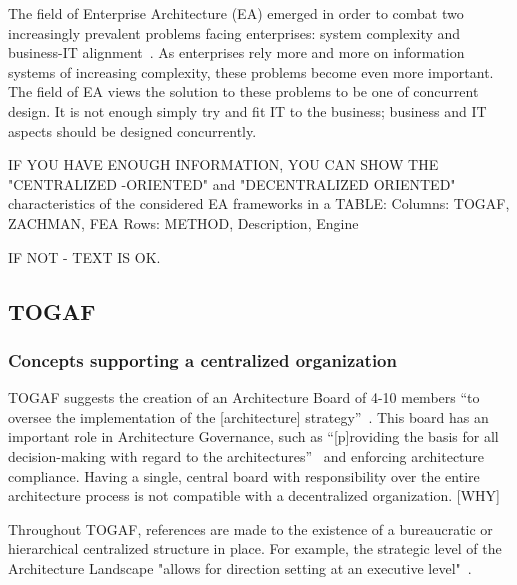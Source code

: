 The field of Enterprise Architecture (EA) emerged in order to combat two increasingly prevalent problems facing enterprises: system complexity and business-IT alignment~\cite{sessions2007}. As enterprises rely more and more on information systems of increasing complexity, these problems become even more important. The field of EA views the solution to these problems to be one of concurrent design. It is not enough simply try and fit IT to the business; business and IT aspects should be designed concurrently.
%
%   
%    

IF YOU HAVE ENOUGH INFORMATION, YOU CAN SHOW THE "CENTRALIZED -ORIENTED" and "DECENTRALIZED ORIENTED" characteristics of the considered EA frameworks in a TABLE: 
Columns: TOGAF, ZACHMAN, FEA
Rows: METHOD, Description, Engine

IF NOT - TEXT IS OK.

\subsection{TOGAF}

\subsubsection{Concepts supporting a centralized organization}

TOGAF suggests the creation of an Architecture Board of 4-10 members ``to oversee the implementation of the [architecture] strategy''~\cite{togaf9.1}. This board has an important role in Architecture Governance, such as ``[p]roviding the basis for all decision-making with regard to the architectures''~\cite{togaf9.1} and enforcing architecture compliance. Having a single, central board with responsibility over the entire architecture process is not compatible with a decentralized organization. [WHY]

Throughout TOGAF, references are made to the existence of a bureaucratic or hierarchical centralized structure in place. For example, the strategic level of the Architecture Landscape "allows for direction setting at an executive level"~\cite{togaf9.1}.





